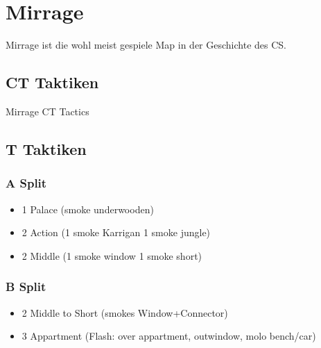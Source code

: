\newpage




\chapter{Mirrage}
\label{chap:Mirrage}
Mirrage ist die wohl meist gespiele Map in der Geschichte des CS.

\section{CT Taktiken}
\label{sect:Mirrage_ct}
Mirrage CT Tactics

\section{T Taktiken}
\label{sect:Mirrage_t}
\subsection{A Split}
\label{subsect:mirrage_a_split}
\begin{itemize}
\item 1 Palace (smoke underwooden)
\item 2 Action (1 smoke Karrigan 1 smoke jungle)
\item 2 Middle (1 smoke window 1 smoke short)
\end{itemize}

\subsection{B Split}
\label{subsect:mirrage_b_split}
\begin{itemize}
\item 2 Middle to Short (smokes Window+Connector)
\item 3 Appartment (Flash: over appartment, outwindow, molo bench/car)
\end{itemize}



